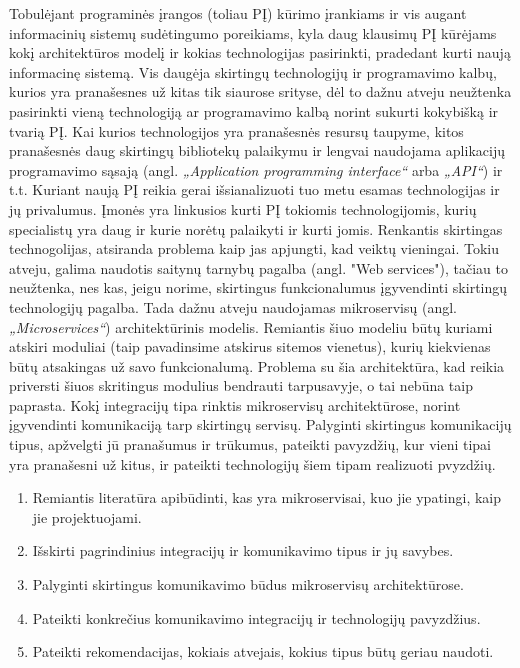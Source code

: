 
Tobulėjant programinės įrangos (toliau PĮ) kūrimo įrankiams ir vis augant informacinių sistemų sudėtingumo poreikiams,
kyla daug klausimų PĮ kūrėjams kokį architektūros modelį ir kokias technologijas pasirinkti, pradedant kurti naują informacinę sistemą.
Vis daugėja skirtingų technologijų ir programavimo kalbų, kurios yra pranašesnes už kitas tik siaurose srityse,
dėl to dažnu atveju neužtenka pasirinkti vieną technologiją ar programavimo kalbą norint sukurti kokybišką ir
tvarią PĮ. Kai kurios technologijos yra pranašesnės resursų taupyme, kitos pranašesnės daug skirtingų bibliotekų palaikymu ir lengvai naudojama
aplikacijų programavimo sąsają (angl. \textit{„Application programming interface“} arba \textit{„API“}) ir t.t.
Kuriant naują PĮ reikia gerai išsianalizuoti tuo metu esamas technologijas ir jų privalumus.
Įmonės yra linkusios kurti PĮ tokiomis technologijomis, kurių specialistų yra daug ir kurie norėtų palaikyti ir kurti jomis.
Renkantis skirtingas technogolijas, atsiranda problema kaip jas apjungti, kad veiktų vieningai.
Tokiu atveju, galima naudotis saitynų tarnybų pagalba (angl. "Web services"), tačiau to neužtenka,
nes kas, jeigu norime, skirtingus funkcionalumus įgyvendinti skirtingų technologijų pagalba.
Tada dažnu atveju naudojamas mikroservisų (angl. \textit{„Microservices“}) architektūrinis modelis. Remiantis šiuo modeliu būtų kuriami atskiri moduliai (taip pavadinsime atskirus sitemos vienetus), kurių
kiekvienas būtų atsakingas už savo funkcionalumą. Problema su šia architektūra, kad reikia priversti šiuos skritingus modulius bendrauti tarpusavyje, o tai nebūna taip paprasta.
Kokį integracijų tipa rinktis mikroservisų architektūrose, norint įgyvendinti komunikaciją tarp skirtingų servisų.
Palyginti skirtingus komunikacijų tipus, apžvelgti jū pranašumus ir trūkumus, pateikti pavyzdžių, kur vieni tipai yra pranašesni už kitus, 
ir pateikti technologijų šiem tipam realizuoti pvyzdžių.
\begin{enumerate}
	\item Remiantis literatūra apibūdinti, kas yra mikroservisai, kuo jie ypatingi, kaip jie projektuojami.
	\item Išskirti pagrindinius integracijų ir komunikavimo tipus ir jų savybes.
	\item Palyginti skirtingus komunikavimo būdus mikroservisų architektūrose.
	\item Pateikti konkrečius komunikavimo integracijų ir technologijų pavyzdžius.
	\item Pateikti rekomendacijas, kokiais atvejais, kokius tipus būtų geriau naudoti.
\end{enumerate}

